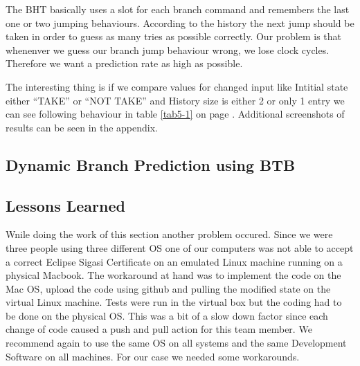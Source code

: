 The BHT basically uses a slot for each branch command and remembers the last one or two jumping behaviours. According to the history the next jump should be taken in order to guess as many tries as possible correctly. Our problem is that whenenver we guess our branch jump behaviour wrong, we lose clock cycles. Therefore we want a prediction rate as high as possible. 

The interesting thing is if we compare values for changed input like Intitial state either ``TAKE'' or ``NOT TAKE'' and History size is either 2 or only 1 entry we can see following behaviour in table \ref{tab5-1} on page \pageref{tab5-1}. Additional screenshots of results can be seen in the appendix.

\begin{table}[h]
\end{table}


\subsection{Dynamic Branch Prediction using BTB}

\subsection{Lessons Learned}
Wnile doing the work of this section another problem occured. Since we were three people using three different OS one of our computers was not able to accept a correct Eclipse Sigasi Certificate on an emulated Linux machine running on a physical Macbook. The workaround at hand was to implement the code on the Mac OS, upload the code using github and pulling the modified  state on the virtual Linux machine. Tests were run in the virtual box but the coding had to be done on the physical OS. This was a bit of a slow down factor since each change of code caused a push and pull action for this team member. We recommend again to use the same OS on all systems and the same Development Software on all machines. For our case we needed some workarounds.
